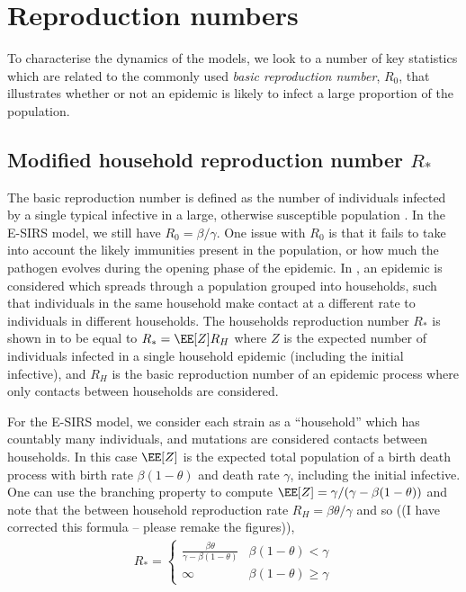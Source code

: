 \documentclass[smallextended]{svjour3}       %
\begin{document}
\section{Reproduction numbers}\label{sec: repro}
To characterise the dynamics of the models, we look to a number of key statistics which are related to the commonly used \emph{basic reproduction number}, $R_0$, that illustrates whether or not an epidemic is likely to infect a large proportion of the population. 

\subsection{Modified household reproduction number $R_*$}\label{subsec: rstar}
The basic reproduction number is defined as the number of individuals infected by a single typical infective in a large, otherwise susceptible population \cite{Anderson1992}. In the E-SIRS model, we still have $R_0 = \beta/\gamma$. One issue with $R_0$ is that it fails to take into account the likely immunities present in the population, or how much the pathogen evolves during the opening phase of the epidemic. In \cite{Ball1997}, an epidemic is considered which spreads through a population grouped into households, such that individuals in the same household make contact at a different rate to individuals in different households. The households reproduction number $R_*$ is shown in \cite{Ball1997} to be equal to $R_* = \EE[Z]R_H$
where $Z$ is the expected number of individuals infected in a single household epidemic (including the initial infective), and $R_H$ is the basic reproduction number of an epidemic process where only contacts between households are considered. 

For the E-SIRS model, we consider each strain as a ``household'' which has countably many individuals, and mutations are considered contacts between households. In this case $\EE[Z]$ is the expected total population of a birth death process with birth rate $\beta(1-\theta)$ and death rate $\gamma$, including the initial infective. One can use the branching property to compute $\EE[Z]=\gamma/(\gamma-\beta(1-\theta))$ and note that the between household reproduction rate $R_H=\beta\theta/\gamma$ and so ((I have corrected this formula -- please remake the figures)),
\begin{align*}
R_* = \begin{cases}
\frac{\beta\theta}{\gamma - \beta(1-\theta)} & \beta(1-\theta) < \gamma \\
\infty & \beta(1-\theta) \geq \gamma
\end{cases}
\end{align*}
\end{document}
